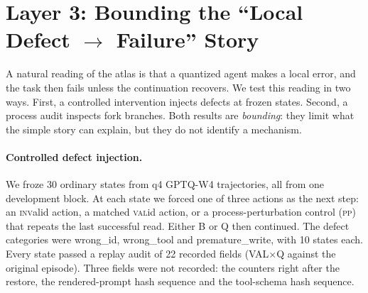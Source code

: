 \section{Layer 3: Bounding the ``Local Defect $\rightarrow$ Failure'' Story}
\label{sec:intervention}

A natural reading of the atlas is that a quantized agent makes a local error, and the task then fails unless the continuation recovers. We test this reading in two ways. First, a controlled intervention injects defects at frozen states. Second, a process audit inspects fork branches. Both results are \emph{bounding}: they limit what the simple story can explain, but they do not identify a mechanism.

\paragraph{Controlled defect injection.} We froze 30 ordinary states from q4 GPTQ-W4 trajectories, all from one development block. At each state we forced one of three actions as the next step: an \textsc{inv}alid action, a matched \textsc{val}id action, or a process-perturbation control (\textsc{pp}) that repeats the last successful read. Either B or Q then continued. The defect categories were wrong\_id, wrong\_tool and premature\_write, with 10 states each. %
Every state passed a replay audit of 22 recorded fields (VAL$\times$Q against the original episode). Three fields were not recorded: the counters right after the restore, the rendered-prompt hash sequence and the tool-schema hash sequence. %

